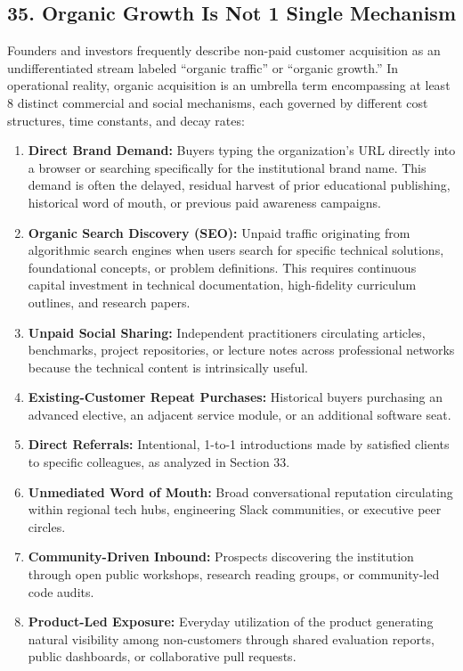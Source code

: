 \subsection*{35. Organic Growth Is Not 1 Single Mechanism}

Founders and investors frequently describe non-paid customer acquisition as an undifferentiated stream labeled ``organic traffic'' or ``organic growth.'' In operational reality, organic acquisition is an umbrella term encompassing at least 8 distinct commercial and social mechanisms, each governed by different cost structures, time constants, and decay rates:

\begin{enumerate}[leftmargin=*]
\item \textbf{Direct Brand Demand:} Buyers typing the organization's URL directly into a browser or searching specifically for the institutional brand name. This demand is often the delayed, residual harvest of prior educational publishing, historical word of mouth, or previous paid awareness campaigns.
\item \textbf{Organic Search Discovery (SEO):} Unpaid traffic originating from algorithmic search engines when users search for specific technical solutions, foundational concepts, or problem definitions. This requires continuous capital investment in technical documentation, high-fidelity curriculum outlines, and research papers.
\item \textbf{Unpaid Social Sharing:} Independent practitioners circulating articles, benchmarks, project repositories, or lecture notes across professional networks because the technical content is intrinsically useful.
\item \textbf{Existing-Customer Repeat Purchases:} Historical buyers purchasing an advanced elective, an adjacent service module, or an additional software seat.
\item \textbf{Direct Referrals:} Intentional, 1-to-1 introductions made by satisfied clients to specific colleagues, as analyzed in Section 33.
\item \textbf{Unmediated Word of Mouth:} Broad conversational reputation circulating within regional tech hubs, engineering Slack communities, or executive peer circles.
\item \textbf{Community-Driven Inbound:} Prospects discovering the institution through open public workshops, research reading groups, or community-led code audits.
\item \textbf{Product-Led Exposure:} Everyday utilization of the product generating natural visibility among non-customers through shared evaluation reports, public dashboards, or collaborative pull requests.
\end{enumerate}


